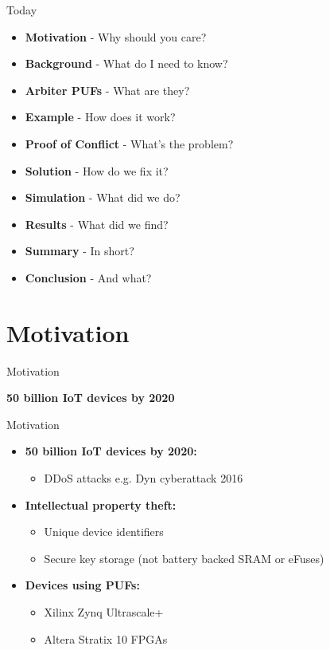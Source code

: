 \documentclass[10pt, compress]{beamer}
\begin{document}
\begin{frame}{Today}
    \begin{itemize}[itemsep=0.25cm]
        \item \textbf{Motivation} - Why should you care?
        \item \textbf{Background} - What do I need to know?
        \item \textbf{Arbiter PUFs} - What are they?
        \item \textbf{Example} - How does it work?
        \item \textbf{Proof of Conflict} - What's the problem?
        \item \textbf{Solution} - How do we fix it?
        \item \textbf{Simulation} - What did we do?
        \item \textbf{Results} - What did we find?
        \item \textbf{Summary} - In short?
        \item \textbf{Conclusion} - And what?
    \end{itemize}
\end{frame}

\section{Motivation}

\begin{frame}{Motivation}
    \begin{center}
        \LARGE\textbf{50 billion IoT devices by 2020}
    \end{center}
\end{frame}

\begin{frame}{Motivation}
    \begin{itemize}[itemsep=0.5cm]
        \item \textbf{50 billion IoT devices by 2020:}
        \begin{itemize}
            \item DDoS attacks e.g. Dyn cyberattack 2016
        \end{itemize}
        \item \textbf{Intellectual property theft:} 
        \begin{itemize}
            \item Unique device identifiers
            \item Secure key storage (not battery backed SRAM or eFuses)
        \end{itemize}
        \item \textbf{Devices using PUFs:}
        \begin{itemize}
            \item Xilinx Zynq Ultrascale+ 
            \item Altera Stratix 10 FPGAs
        \end{itemize}
    \end{itemize}
\end{frame}
\end{document}
